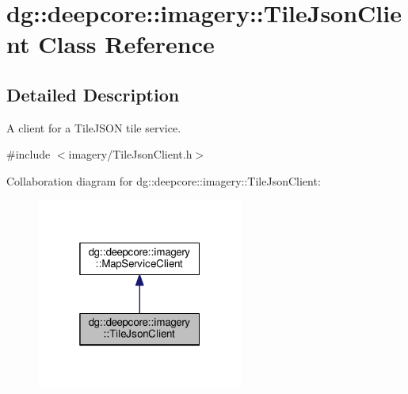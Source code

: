 \hypertarget{classdg_1_1deepcore_1_1imagery_1_1_tile_json_client}{}\section{dg\+:\+:deepcore\+:\+:imagery\+:\+:Tile\+Json\+Client Class Reference}
\label{classdg_1_1deepcore_1_1imagery_1_1_tile_json_client}


\subsection{Detailed Description}
A client for a Tile\+J\+S\+ON tile service. 

{\ttfamily \#include $<$imagery/\+Tile\+Json\+Client.\+h$>$}



Collaboration diagram for dg\+:\+:deepcore\+:\+:imagery\+:\+:Tile\+Json\+Client\+:
\nopagebreak
\begin{figure}[H]
\begin{center}
\leavevmode
\includegraphics[width=193pt]{classdg_1_1deepcore_1_1imagery_1_1_tile_json_client__coll__graph}
\end{center}
\end{figure}
